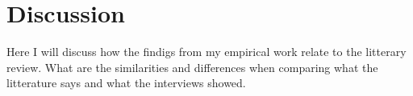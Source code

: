
\chapter{Discussion}
\label{chapter:discussion}

Here I will discuss how the findigs from my empirical work relate to the litterary review. What are the similarities and differences when comparing what the litterature says and what the interviews showed.

